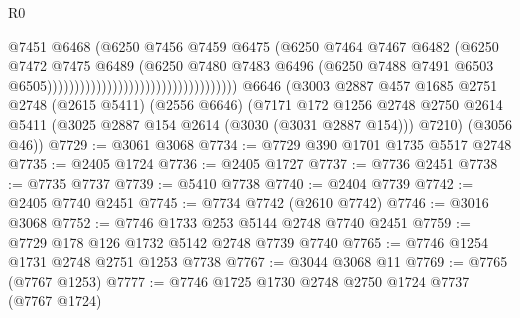 \begin{lexlean}{R0}
\begin{coremodule}
                                                                @7451
                                                                @6468
                                                                (@6250
                                                                  @7456
                                                                  @7459
                                                                  @6475
                                                                  (@6250
                                                                    @7464
                                                                    @7467
                                                                    @6482
                                                                    (@6250
                                                                      @7472
                                                                      @7475
                                                                      @6489
                                                                      (@6250
                                                                        @7480
                                                                        @7483
                                                                        @6496
                                                                        (@6250
                                                                          @7488
                                                                          @7491
                                                                          @6503
                                                                          @6505)))))))))))))))))))))))))))))))))))
    @6646
    (@3003
      @2887
      @457
      @1685
      @2751
      @2748
      (@2615 @5411)
      (@2556 @6646)
      (@7171
        @172
        @1256
        @2748
        @2750
        @2614
        @5411
        (@3025 @2887 @154 @2614 (@3030 (@3031 @2887 @154)))
        @7210)
      (@3056 @46))
@7729 := @3061 @3068
@7734 := @7729 @390 @1701 @1735 @5517 @2748
@7735 := @2405 @1724
@7736 := @2405 @1727
@7737 := @7736 @2451
@7738 := @7735 @7737
@7739 := @5410 @7738
@7740 := @2404 @7739
@7742 := @2405 @7740 @2451
@7745 := @7734 @7742 (@2610 @7742)
@7746 := @3016 @3068
@7752 := @7746 @1733 @253 @5144 @2748 @7740 @2451
@7759 := @7729 @178 @126 @1732 @5142 @2748 @7739 @7740
@7765 := @7746 @1254 @1731 @2748 @2751 @1253 @7738
@7767 := @3044 @3068 @11
@7769 := @7765 (@7767 @1253)
@7777 := @7746 @1725 @1730 @2748 @2750 @1724 @7737 (@7767 @1724)

\end{coremodule}
\end{lexlean}
